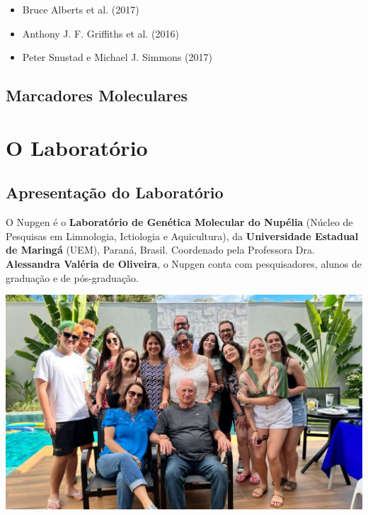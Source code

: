 \documentclass[
  letterpaper,
  DIV=11,
  numbers=noendperiod]{scrreprt}
\begin{document}
\begin{itemize}
\item
  Bruce Alberts et al. (2017)
\item
  Anthony J. F. Griffiths et al. (2016)
\item
  Peter Snustad e Michael J. Simmons (2017)
\end{itemize}

\hypertarget{marcadores-moleculares}{%
\section{Marcadores Moleculares}\label{marcadores-moleculares}}


\hypertarget{o-laboratuxf3rio}{%
\chapter{O Laboratório}\label{o-laboratuxf3rio}}

\hypertarget{apresentauxe7uxe3o-do-laboratuxf3rio}{%
\section{Apresentação do
Laboratório}\label{apresentauxe7uxe3o-do-laboratuxf3rio}}

O Nupgen é o \textbf{Laboratório de Genética Molecular do Nupélia}
(Núcleo de Pesquisas em Limnologia, Ictiologia e Aquicultura), da
\textbf{Universidade Estadual de Maringá} (UEM), Paraná, Brasil.
Coordenado pela Professora Dra. \textbf{Alessandra Valéria de Oliveira},
o Nupgen conta com pesquisadores, alunos de graduação e de
pós-graduação.

\includegraphics{figures/lab.jpeg}
\end{document}
